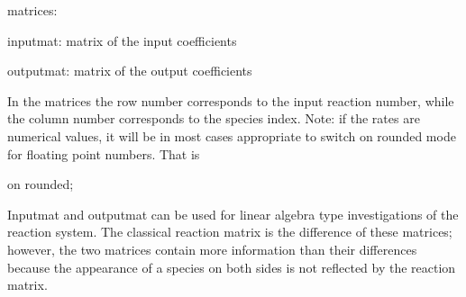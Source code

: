  matrices:

 inputmat: matrix of the input coefficients

 outputmat: matrix of the output coefficients

In the matrices the row number corresponds to the input reaction 
number, while the column number corresponds to the species index.
Note: if the rates are numerical values, it will be in most cases
appropriate to switch on \REDUCE{} rounded mode for floating
point numbers. That is


on rounded;

Inputmat and outputmat can be used for linear algebra type 
investigations of the reaction system. The classical reaction 
matrix is the difference of these matrices; however, the two 
matrices contain more information than their differences because 
the appearance of a species on both sides is not reflected by 
the reaction matrix.

